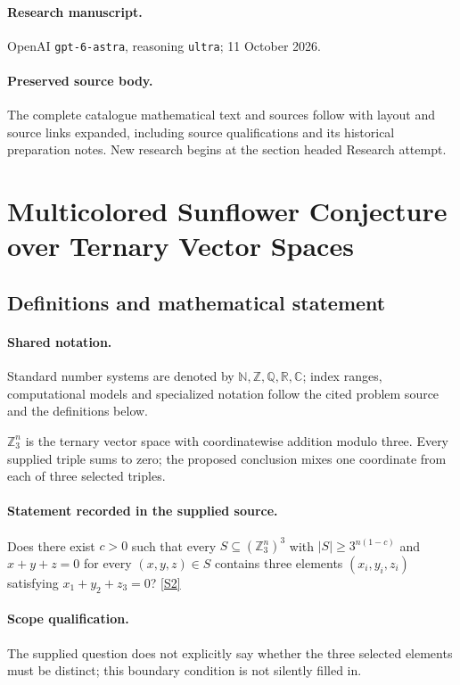 \documentclass[11pt]{article}
\begin{document}
\paragraph{Research manuscript.} OpenAI \texttt{gpt-6-astra}, reasoning \texttt{ultra}; 11 October 2026.
\paragraph{Preserved source body.} The complete catalogue mathematical text and sources follow with layout and source links expanded, including source qualifications and its historical preparation notes. New research begins at the section headed Research attempt.

\section{Multicolored Sunflower Conjecture over Ternary Vector Spaces}\label{statement}

\subsection{Definitions and mathematical statement}

\paragraph{Shared notation.}Standard number systems are denoted by $\mathbb N,\mathbb Z,\mathbb Q,\mathbb R,\mathbb C$; index ranges, computational models and specialized notation follow the cited problem source and the definitions below.


$\mathbb Z_3^n$ is the ternary vector space with coordinatewise addition modulo three. Every supplied triple sums to zero; the proposed conclusion mixes one coordinate from each of three selected triples.
\paragraph{Statement recorded in the supplied source.}
Does there exist $c>0$ such that every $S\subseteq(\mathbb Z_3^n)^3$ with $|S|\geq3^{n(1-c)}$ and $x+y+z=0$ for every $(x,y,z)\in S$ contains three elements $(x_i,y_i,z_i)$ satisfying $x_1+y_2+z_3=0$? \href{https://doi.org/10.4171/owr/2012/54}{[S2]}
\paragraph{Scope qualification.}
The supplied question does not explicitly say whether the three selected elements must be distinct; this boundary condition is not silently filled in.
\end{document}
